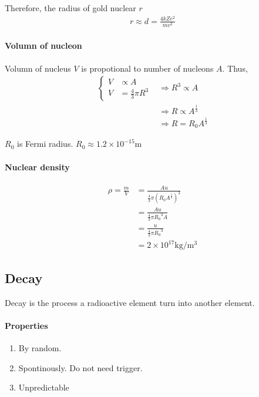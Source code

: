             Therefore, the radius of gold nuclear $r$
            \begin{align}
                r \approx d = \frac{4 k Z e^2}{m v^2}
            \end{align}
            
        \paragraph{Volumn of nucleon}
            Volumn of nucleus $V$ is propotional to number of nucleons $A$. Thus,
            \begin{align}
                \left\{
                    \begin{aligned}
                        V &\propto A \\
                        V &= \frac{4}{3} \pi R^3
                    \end{aligned}
                \right. &\Rightarrow 
                R^3 \propto A \\
                &\Rightarrow R \propto A^{\frac{1}{3}} \\
                &\Rightarrow R = R_0 A^{\frac{1}{3}}
            \end{align}

            $R_0$ is Fermi radius. $R_0 \approx 1.2 \times 10^{-15} \mathrm{m}$
        
        \paragraph{Nuclear density} 
            \begin{align}
                \rho = \frac{m}{V} &= \frac{A u}{\frac{4}{3} \pi (R_0 A^{\frac{1}{3}})^3} \\
                                   &= \frac{A u}{\frac{4}{3} \pi {R_0}^3 A} \\
                                   &= \frac{u}{\frac{4}{3} \pi {R_0}^3} \\
                                   &= 2 \times 10^{17} \mathrm{kg/m^3}
            \end{align}


    \subsection{Decay}
        Decay is the process a radioactive element turn into another element.

        \paragraph{Properties}
            \begin{enumerate}
                \item By random.
                \item Spontinously. Do not need trigger.
                \item Unpredictable
            \end{enumerate}

